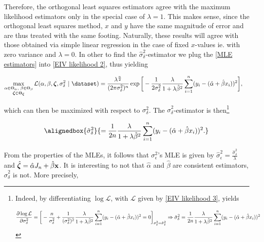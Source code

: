 \documentclass{homework}
\begin{document}
Therefore, the orthogonal least squares estimators agree with the maximum likelihood estimators only in the special case of $\lambda = 1$. This makes sense, since the orthogonal least squares method, $x$ and $y$ have the same magnitude of error and are thus treated with the same footing. Naturally, these results will agree with those obtained via simple linear regression in the case of fixed $x$-values ie. with zero variance and $\lambda = 0$. In other to find the $\hat{\sigma}^2_\delta$-estimator we plug the \eqref{MLE estimators} into \eqref{EIV likelihood 2}, thus yielding 

\begin{align}
    \max_{\substack{ \alpha \in \Theta_\alpha, \blank \beta \in \Theta_\beta \\
    \bm{\zeta} \in \Theta_{\bm{\zeta}}}}
    \mathcal{L}(\alpha, \beta, \bm{\zeta}, \sigma_{\delta}^2 \blank &| \blank \dataset) =        \frac{{\lambda}^{\frac{n}{2}}}{(2\pi\sigma_{\delta}^2 )^{n}} \exp\bigg[- \frac{1}{2\sigma_\delta^2}  \frac{\lambda}{1+\lambda \hat{\beta}^2} \summation (y_i - ( \hat{\alpha} +  \hat{\beta }x_i))^2\bigg] 
    \label{EIV likelihood 3},
\end{align}

which can then be maximized with respect to $\sigma^2_\delta$. The $\hat{\sigma}^2_\delta$-estimator is then\footnote{Indeed, by differentiating $\log \mathcal{L}$, with $\mathcal{L}$ given by \eqref{EIV likelihood 3}, yields 

\begin{align*}
    \frac{\partial \log \mathcal{L}}{\partial {\sigma}^2_\delta} = \bigg[- \frac{n}{{\sigma}^2_\delta} + \frac{1}{({\sigma}^2_\delta)^2} \frac{\lambda}{1+\lambda \hat{\beta}^2} \sum_{i=1}^{n} (y_i - ( \hat{\alpha} +  \hat{\beta }x_i))^2 = 0 \bigg]_{{\sigma}^2_\delta = \hat{{\sigma}}^2_\delta} \Rightarrow \hat{\sigma}^2_\delta = \frac{1}{2n}   \frac{\lambda}{1+\lambda \hat{\beta}^2} \sum_{i=1}^{n} (y_i - ( \hat{\alpha} +  \hat{\beta }x_i))^2
\end{align*}}

\begin{align}
    \alignedbox{\hat{\sigma}^2_\delta}{ = \frac{1}{2n} \frac{\lambda}{1+\lambda \hat{\beta}^2} \summation (y_i - ( \hat{\alpha} +  \hat{\beta }x_i))^2.}
\end{align}

From the properties of the MLEs, it follows that ${\sigma}^2_\epsilon$'s MLE is given by $\hat{\sigma}^2_\epsilon = \frac{\hat{\sigma}^2_\delta}{\lambda}$ and $\hat{\bm{\zeta}} = \hat{\alpha} J_n + \hat{\beta}{\bf x}$. It is interesting to not that $\hat{\alpha}$ and $\hat{\beta}$ are consistent estimators, $\hat{\sigma}^2_\delta$ is not. More precisely,
\end{document}

